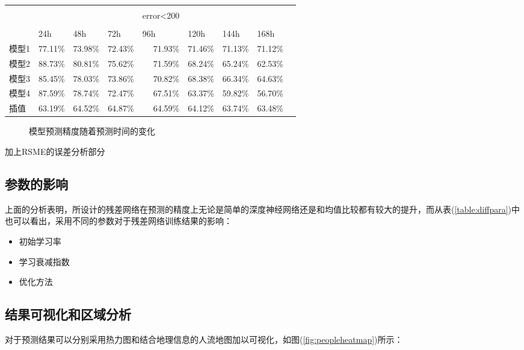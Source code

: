 \begin{table}[htbp]
\begin{tabular}{rrrrrrrrr}
     \hline
          &       &       &       &       &       &       &       &  \\
          &       &       &       &\multicolumn{1}{l}{error<200} &       &       &       &  \\ \\
          \hline
          & \multicolumn{1}{l}{24h} & \multicolumn{1}{l}{48h} & \multicolumn{1}{l}{72h} & \multicolumn{1}{l}{96h} & \multicolumn{1}{l}{120h} & \multicolumn{1}{l}{144h} & \multicolumn{1}{l}{168h} &  \\
          \hline
    \multicolumn{1}{l}{模型1} & 77.11\% & 73.98\% & 72.43\% & 71.93\% & 71.46\% & 71.13\% & 71.12\% &  \\
    \multicolumn{1}{l}{模型2} & 88.73\% & 80.81\% & 75.62\% & 71.59\% & 68.24\% & 65.24\% & 62.53\% &  \\
    \multicolumn{1}{l}{模型3} & 85.45\% & 78.03\% & 73.86\% & 70.82\% & 68.38\% & 66.34\% & 64.63\% &  \\
    \multicolumn{1}{l}{模型4} & 87.59\% & 78.74\% & 72.47\% & 67.51\% & 63.37\% & 59.82\% & 56.70\% &  \\
    \multicolumn{1}{l}{插值} & 63.19\% & 64.52\% & 64.87\% & 64.59\% & 64.12\% & 63.74\% & 63.48\% &  \\
    \hline
    \end{tabular}%
  \label{tab:diffpara}%
\end{table}%

\begin{figure}[ht]
\centering
{}
\hfill
\caption{模型预测精度随着预测时间的变化}
\end{figure}
加上RSME的误差分析部分
\subsection*{参数的影响}
上面的分析表明，所设计的残差网络在预测的精度上无论是简单的深度神经网络还是和均值比较都有较大的提升，而从表(\ref{table:diffpara})中也可以看出，采用不同的参数对于残差网络训练结果的影响：
\begin{itemize}
	\item 初始学习率
	\item 学习衰减指数
	\item 优化方法
\end{itemize}
\subsection{结果可视化和区域分析}
对于预测结果可以分别采用热力图和结合地理信息的人流地图加以可视化，如图(\ref{fig:peopleheatmap})所示：

